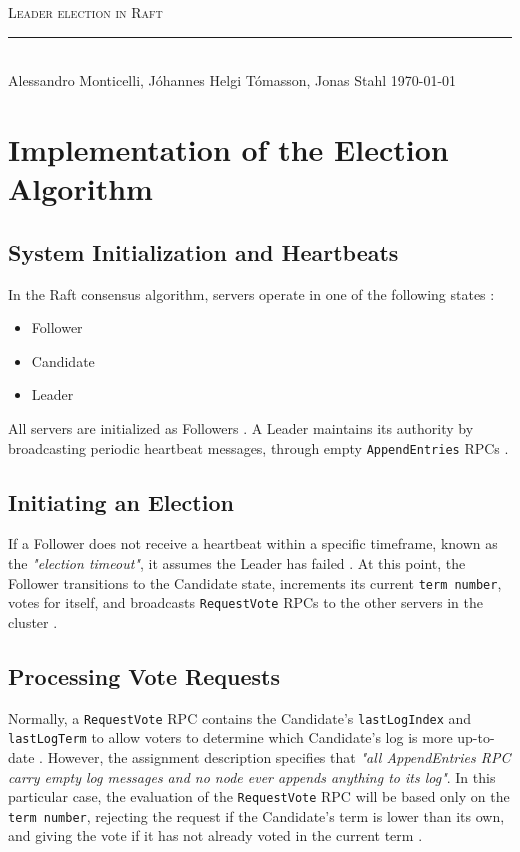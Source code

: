 \documentclass[a4paper,11pt]{article}
\newcommand{\linia}{\rule{\linewidth}{0.5pt}}
\begin{document}
\begin{center}
    \vspace{2ex}
    {\huge \textsc{Leader election in Raft}}
    \vspace{1ex}
    \\
    \linia\\
    Alessandro Monticelli, Jóhannes Helgi Tómasson, Jonas Stahl \hfill \today 
    \vspace{4ex}
\end{center}

\section{Implementation of the Election Algorithm}

\subsection{System Initialization and Heartbeats}
In the Raft consensus algorithm, servers operate in one of the following states \cite{184040,tanenbaum2007distributed}:
\begin{itemize}
    \item Follower
    \item Candidate
    \item Leader
\end{itemize}
All servers are initialized as Followers \cite{184040,tanenbaum2007distributed}.
A Leader maintains its authority by broadcasting periodic heartbeat messages,
through empty \texttt{AppendEntries} RPCs \cite{184040,tanenbaum2007distributed}.

\subsection{Initiating an Election}
If a Follower does not receive a heartbeat within a specific timeframe,
known as the \textit{"election timeout"}, it assumes the Leader has failed \cite{184040, tanenbaum2007distributed}.
At this point, the Follower transitions to the Candidate state,
increments its current \texttt{term number}, votes for itself, and broadcasts
\texttt{RequestVote} RPCs to the other servers in the cluster \cite{184040,tanenbaum2007distributed}.

\subsection{Processing Vote Requests}
Normally, a \texttt{RequestVote} RPC contains the Candidate's \texttt{lastLogIndex} 
and \texttt{lastLogTerm} to allow voters to determine which Candidate's log is 
more up-to-date \cite{184040}.
However, the assignment description specifies that \textit{"all AppendEntries RPC
carry empty log messages and no node ever appends anything to its log"}.
In this particular case, the evaluation of the \texttt{RequestVote} RPC will be
based only on the \texttt{term number}, rejecting the request if the Candidate's
term is lower than its own, and giving the vote if it has not already voted in
the current term \cite{tanenbaum2007distributed}.
\end{document}
